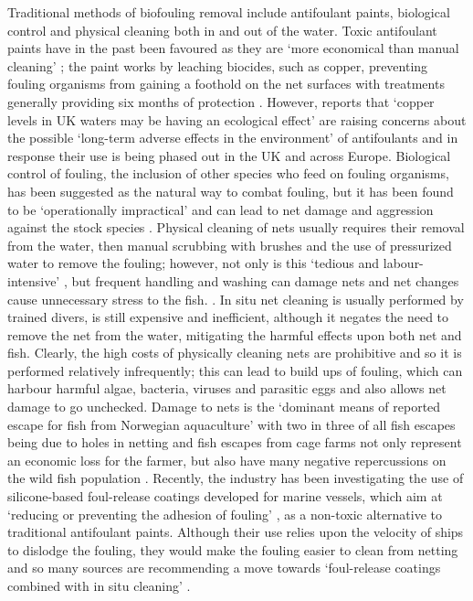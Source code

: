 \documentclass[11.5pt, twoside, a4paper]{article}
\begin{document}
Traditional methods of biofouling removal include antifoulant paints, biological control and physical cleaning both in and out of the water. Toxic antifoulant paints have in the past been favoured as they are `more economical than manual cleaning' \cite{braithwaite2004marine}; the paint works by leaching biocides, such as copper, preventing fouling organisms from gaining a foothold on the net surfaces with treatments generally providing six months of protection \cite{beveridge2008cage}. However, reports that `copper levels in UK waters may be having an ecological effect' are raising concerns about the possible `long-term adverse effects in the environment' of antifoulants and in response their use is being phased out in the UK and across Europe. \cite{fitridge2012impact,braithwaite2004marine} Biological control of fouling, the inclusion of other species who feed on fouling organisms, has been suggested as the natural way to combat fouling, but it has been found to be `operationally impractical' \cite{Crown} and can lead to net damage and aggression against the stock species \cite{beveridge2008cage}. Physical cleaning of nets usually requires their removal from the water, then manual scrubbing with brushes and the use of pressurized water to remove the fouling; however, not only is this `tedious and labour-intensive' \cite{braithwaite2004marine}, but frequent handling and washing can damage nets and net changes cause unnecessary stress to the fish. \cite{Crown,fitridge2012impact}. In situ net cleaning is usually performed by trained divers, is still expensive and inefficient, although it negates the need to remove the net from the water, mitigating the harmful effects upon both net and fish. Clearly, the high costs of physically cleaning nets are prohibitive and so it is performed relatively infrequently; this can lead to build ups of fouling, which can harbour harmful algae, bacteria, viruses and parasitic eggs and also allows net damage to go unchecked. Damage to nets is the `dominant means of reported escape for fish from Norwegian aquaculture' with two in three of all fish escapes being due to holes in netting \cite{jensen2010escapes} and fish escapes from cage farms not only represent an economic loss for the farmer, but also have many negative repercussions on the wild fish population \cite{mcdowell2002stream,jensen2010escapes}. Recently, the industry has been investigating the use of silicone-based foul-release coatings developed for marine vessels, which aim at `reducing or preventing the adhesion of fouling' \cite{fitridge2012impact}, as a non-toxic alternative to traditional antifoulant paints. Although their use relies upon the velocity of ships to dislodge the fouling, they would make the fouling easier to clean from netting and so many sources are recommending a move towards `foul-release coatings combined with in situ cleaning' \cite{Crown}. 
\end{document}
